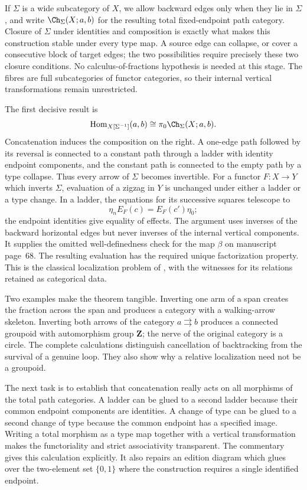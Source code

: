 If $\Sigma$ is a wide subcategory of $X$, we allow backward edges only when they lie in $\Sigma$, and write $\Ch_\Sigma(X;a,b)$ for the resulting total fixed-endpoint path category.  Closure of $\Sigma$ under identities and composition is exactly what makes this construction stable under every type map.  A source edge can collapse, or cover a consecutive block of target edges; the two possibilities require precisely these two closure conditions.  No calculus-of-fractions hypothesis is needed at this stage.  The fibres are full subcategories of functor categories, so their internal vertical transformations remain unrestricted.

The first decisive result is
\[
 \operatorname{Hom}_{X[\Sigma^{-1}]}(a,b)
      \cong \pi_0\Ch_\Sigma(X;a,b).
\]
Concatenation induces the composition on the right.  A one-edge path followed by its reversal is connected to a constant path through a ladder with identity endpoint components, and the constant path is connected to the empty path by a type collapse.  Thus every arrow of $\Sigma$ becomes invertible.  For a functor $F:X\to Y$ which inverts $\Sigma$, evaluation of a zigzag in $Y$ is unchanged under either a ladder or a type change.  In a ladder, the equations for its successive squares telescope to
\[
 \eta_n E_F(c)=E_F(c')\eta_0;
\]
the endpoint identities give equality of effects.  The argument uses inverses of the backward horizontal edges but never inverses of the internal vertical components.  It supplies the omitted well-definedness check for the map $\beta$ on manuscript page~68.  The resulting evaluation has the required unique factorization property.  This is the classical localization problem of \citet[Chapter~I, \S1]{GabrielZisman1967}, with the witnesses for its relations retained as categorical data.

Two examples make the theorem tangible.  Inverting one arm of a span creates the fraction across the span and produces a category with a walking-arrow skeleton.  Inverting both arrows of the category $a\rightrightarrows b$ produces a connected groupoid with automorphism group $\mathbf Z$; the nerve of the original category is a circle.  The complete calculations distinguish cancellation of backtracking from the survival of a genuine loop.  They also show why a relative localization need not be a groupoid.

The next task is to establish that concatenation really acts on all morphisms of the total path categories.  A ladder can be glued to a second ladder because their common endpoint components are identities.  A change of type can be glued to a second change of type because the common endpoint has a specified image.  Writing a total morphism as a type map together with a vertical transformation makes the functoriality and strict associativity transparent.  The commentary gives this calculation explicitly.  It also repairs an edition diagram which glues over the two-element set $\{0,1\}$ where the construction requires a single identified endpoint.


